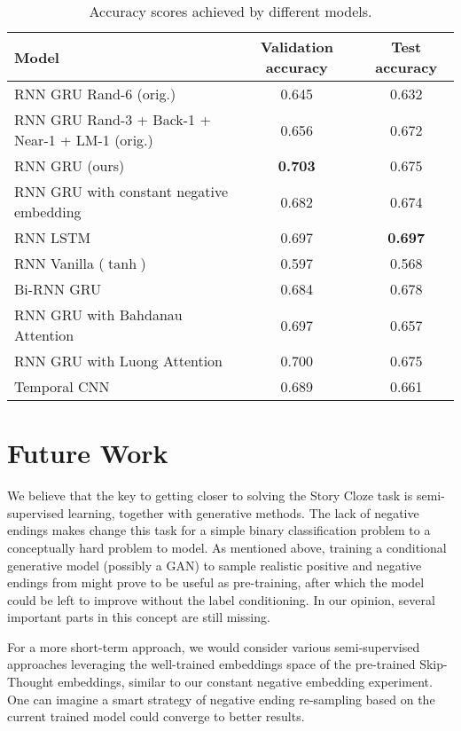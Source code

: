 \documentclass{article}
\begin{document}
\begin{table}[btp]\centering
\begin{tabular}{lcc}
\toprule
Model    	& Validation accuracy  	 		  & Test accuracy  					\\
\midrule
RNN GRU \citep{Roemmele2017AnTest} Rand-6 (orig.)    	& 0.645  	 		  & 0.632  \\
RNN GRU \citep{Roemmele2017AnTest} Rand-3 + Back-1
+ Near-1 + LM-1 (orig.)    	& 0.656  	 		  & 0.672  \\
\midrule

RNN GRU \citep{Roemmele2017AnTest} (ours)    	& \textbf{0.703}  	 		  & 0.675  \\
RNN GRU with constant negative embedding    	& 0.682  	 		  & 0.674 \\
RNN LSTM		& 0.697 		 	  & \textbf{0.697} \\
RNN Vanilla ($\tanh$)		& 0.597 		 	  & 0.568  \\
Bi-RNN GRU		& 0.684   			  & 0.678  \\
RNN GRU with Bahdanau \citep{Bahdanau2016End-to-EndRecognition} Attention     	& 0.697	 	 		  & 0.657  \\
RNN GRU with Luong \citep{Luong2015EffectiveTranslation} Attention    	& 0.700	 	 		  & 0.675  \\
\midrule
Temporal CNN   	& 0.689	 	 		  & 0.661\\\bottomrule
\end{tabular}
\caption{Accuracy scores achieved by different models.}\label{tab:results}
\end{table}

\section{Future Work}\label{sec:futurework}
We believe that the key to getting closer to solving the Story Cloze task is semi-supervised learning, together with generative methods. The lack of negative endings makes change this task for a simple binary classification problem to a conceptually hard problem to model. As mentioned above, training a conditional generative model (possibly a GAN) to sample realistic positive and negative endings from might prove to be useful as pre-training, after which the model could be left to improve without the label conditioning. In our opinion, several important parts in this concept are still missing.

For a more short-term approach, we would consider various semi-supervised approaches leveraging the well-trained embeddings space of the pre-trained Skip-Thought embeddings, similar to our constant negative embedding experiment. One can imagine a smart strategy of negative ending re-sampling based on the current trained model could converge to better results.
\end{document}
